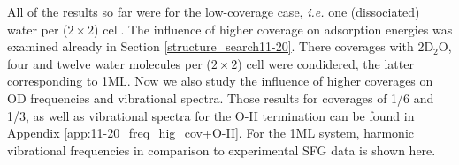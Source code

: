 \documentclass[11pt,DIV=13,BCOR=5mm,a4paper,headinclude]{scrbook}
\newcommand\todo[1]{\textcolor{red}{TODO: \textit{{#1}}}}
\begin{document}


All of the results so far were for the low-coverage case, \textit{i.e.} one (dissociated) water per ($2\times 2$) cell.
The influence of higher coverage on adsorption energies was examined already in Section \ref{structure_search11-20}.
There coverages with 2D$_2$O, four and twelve water molecules per ($2\times 2$) cell were condidered, the latter corresponding to 1ML.
Now we also study the influence of higher coverages on OD frequencies and vibrational spectra.
Those results for coverages of 1/6 and 1/3, as well as vibrational spectra for the O-II termination can be found in Appendix \ref{app:11-20_freq_hig_cov+O-II}.
For the 1ML system, harmonic vibrational frequencies in comparison to experimental SFG data is shown here.
\end{document}
